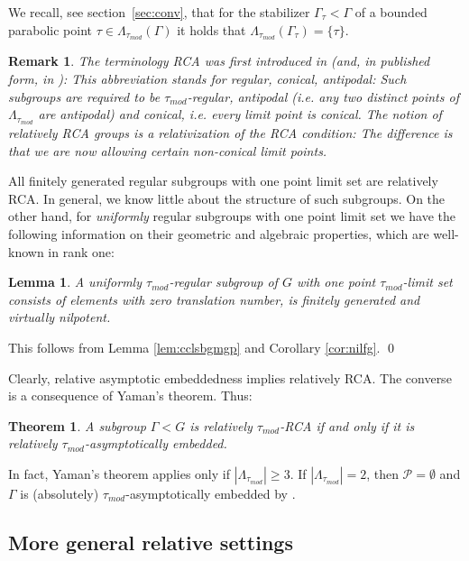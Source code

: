 \documentclass[12pt]{article}
\theoremstyle{boldplain}
\newtheorem{lem}[equation]{Lemma}
\newtheorem{thm}[equation]{Theorem}
\theoremstyle{bolddefinition}
\newtheorem{rem}[equation]{Remark}
\numberwithin{equation}{section}
\def\P{\mathcal P}
\def\Ga{\Gamma}
\def\La{\Lambda}
\def\LatGa{\Lambda_{\tau_{mod}}(\Gamma)}
\def\Lat{\La_{\tau_{mod}}}
\def\taumod{\tau_{mod}}
\begin{document}
We recall, see section~\ref{sec:conv},
that for the stabilizer $\Ga_{\tau}<\Ga$ of a bounded parabolic  point $\tau\in\LatGa$ 
it holds that $\Lat(\Ga_\tau)=\{\tau\}$. 

{
\begin{rem}
The terminology RCA was first introduced in \cite{morse} (and, in published form, in  \cite{anosov}): This abbreviation stands for {\em regular, conical, antipodal}: Such subgroups are required to be $\taumod$-regular, antipodal (i.e. 
any two distinct points of $\Lat$ are antipodal) and conical, i.e. every limit point is conical.  The notion of {\em relatively RCA groups} 
is a relativization of the RCA condition: The difference is that we are now allowing certain non-conical limit points.  
\end{rem}
}


All finitely generated regular subgroups with one point limit set are relatively RCA.
In general, we know little about the structure of such subgroups. 
On the other hand, for {\em uniformly} regular subgroups with one point limit set 
we have the following information on their geometric and algebraic properties,
which are well-known in rank one: 

\begin{lem}\label{lem:ur->fgn}
A uniformly $\taumod$-regular subgroup of $G$ with one point $\taumod$-limit set
consists of elements with zero translation number, 
is finitely generated and virtually nilpotent.  
\end{lem}
\proof This follows from Lemma \ref{lem:cclsbgmgp} and Corollary \ref{cor:nilfg}.  
\qed

\medskip
Clearly, relative asymptotic embeddedness implies relatively RCA.
The converse is a consequence of Yaman's theorem.
Thus:

\begin{thm}\label{thm:RRCA=RAE}
A subgroup $\Ga<G$ is relatively $\taumod$-RCA if and only if it is relatively $\taumod$-asymptotically embedded.
\end{thm}

In fact,
Yaman's theorem applies only if $|\Lat|\geq3$.
If $|\Lat|=2$, then $\P=\emptyset$ and $\Ga$ is (absolutely) $\taumod$-asymptotically embedded
by \cite[Lemma 5.38]{anolec}.


\subsection{More general relative settings}
\label{sec:mgrlstt}
\end{document}

